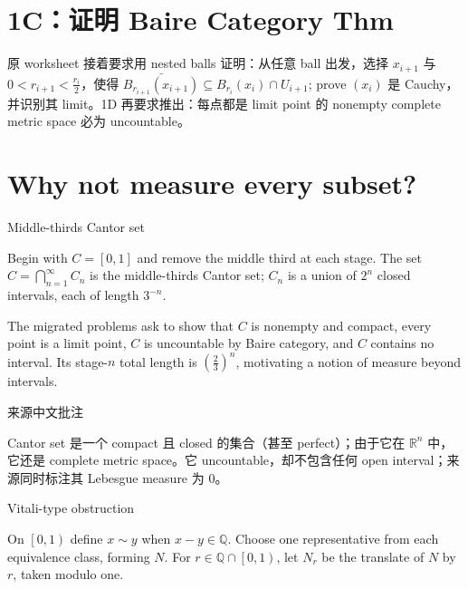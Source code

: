 \section{1C：证明 Baire Category Thm}

原 worksheet 接着要求用 nested balls 证明：从任意 ball 出发，选择 \(x_{i + 1}\) 与 \(0 < r_{i + 1} < \frac{r_{i}}{2}\)，使得 \(\bar{B_{r_{i+1}}\left( x_{i+1} \right)} \subseteq B_{r_{i}}\left( x_{i} \right) \cap U_{i + 1}\); prove \(\left( x_{i} \right)\) 是 Cauchy，并识别其 limit。1D 再要求推出：每点都是 limit point 的 nonempty complete metric space 必为 uncountable。

\section{Why not measure every subset?}

\begin{definition}{Middle-thirds Cantor set}

Begin with \(C = \left\lbrack {0,1} \right\rbrack\) and remove the middle third at each stage. The set \(C = \bigcap_{n = 1}^{\infty}C_{n}\) is the middle-thirds Cantor set; \(C_{n}\) is a union of \(2^{n}\) closed intervals, each of length \(3^{- n}\).

\end{definition}

The migrated problems ask to show that \(C\) is nonempty and compact, every point is a limit point, \(C\) is uncountable by Baire category, and \(C\) contains no interval. Its stage-\(n\) total length is \(\left( \frac{2}{3} \right)^{n}\), motivating a notion of measure beyond intervals.

\begin{qlremark}{来源中文批注}

Cantor set 是一个 compact 且 closed 的集合（甚至 perfect）；由于它在 \(\mathbb{R}^{n}\) 中，它还是 complete metric space。它 uncountable，却不包含任何 open interval；来源同时标注其 Lebesgue measure 为 \(0\)。

\end{qlremark}

\begin{definition}{Vitali-type obstruction}

On \(\left\lbrack {0,1} \right)\) define \(x \sim y\) when \(x - y \in \mathbb{Q}\). Choose one representative from each equivalence class, forming \(N\). For \(r \in \mathbb{Q} \cap \left\lbrack {0,1} \right)\), let \(N_{r}\) be the translate of \(N\) by \(r\), taken modulo one.

\end{definition}

